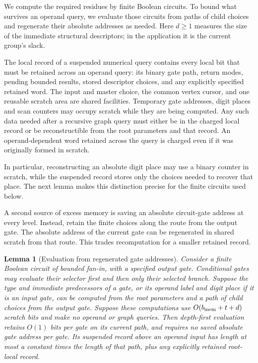 \documentclass[11pt]{article}
\numberwithin{equation}{section}
\newtheorem{lemma}[theorem]{Lemma}
\theoremstyle{definition}
\theoremstyle{remark}
\begin{document}
We compute the required residues by finite Boolean circuits.  To bound
what survives an operand query, we evaluate those circuits from paths
of child choices and regenerate their absolute addresses as needed.
Here $d\geq1$ measures the size of the immediate structural descriptors;
in the application it is the current group's slack.

The local record of a suspended numerical query contains every local bit
that must be retained across an operand query: its binary gate path,
return modes, pending bounded results, stored descriptor choices, and
any explicitly specified retained word.  The input and master choice,
the common vertex cursor, and one reusable scratch area are shared
facilities.  Temporary gate addresses, digit places and scan counters
may occupy scratch while they are being computed.  Any such data needed
after a recursive graph query must either be in the charged local
record or be reconstructible from the root parameters and that record.
An operand-dependent word retained across the query is charged even if
it was originally formed in scratch.

In particular, reconstructing an absolute digit place may use a binary
counter in scratch, while the suspended record stores only the choices
needed to recover that place.  The next lemma makes this distinction
precise for the finite circuits used below.

A second source of excess memory is saving an absolute circuit-gate address at every level. Instead, retain the finite choices along the route from the output gate. The absolute address of the current gate can be regenerated in shared scratch from that route. This trades recomputation for a smaller retained record.

\begin{lemma}[Evaluation from regenerated gate addresses]
\label{lem:arith-gate-evaluation}
Consider a finite Boolean circuit of bounded fan-in, with a specified
output gate.  Conditional gates may evaluate their selector first and
then only their selected branch.  Suppose the type and immediate predecessors of a gate,
or its operand label and digit place if it is an input gate, can be
computed from the root parameters and a path of child choices from
the output gate.  Suppose these computations use $O({b_{\rm mem}}+t+d)$ scratch
bits and make no operand or graph queries.  Then depth-first
evaluation retains $O(1)$ bits per gate on its current path, and
requires no saved absolute gate address per gate.  Its suspended
record above an operand input has length at most a constant times
the length of that path, plus any explicitly retained root-local
record.
\end{lemma}
\end{document}

